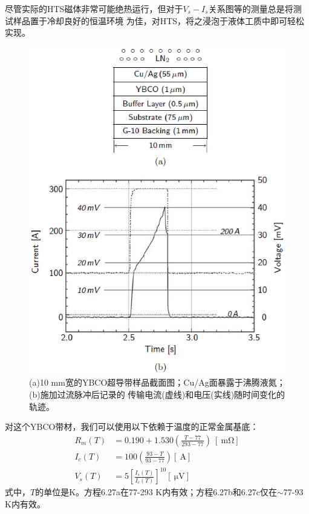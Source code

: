 尽管实际的HTS磁体非常可能绝热运行，但对于$V_s-I_s$关系图等的测量总是将测试样品置于冷却良好的恒温环境
为佳，对HTS，将之浸泡于液体工质中即可轻松实现。
\begin{figure}[htbp]
	\centering
	\includegraphics[scale=0.5]{chpt6/figs/fig6.12.eps}
	\caption{(a)10 mm宽的YBCO超导带样品截面图；Cu/Ag面暴露于沸腾液氮；(b)施加过流脉冲后记录的
		传输电流(虚线)和电压(实线)随时间变化的轨迹。}
\end{figure}
对这个YBCO带材，我们可以使用以下依赖于温度的正常金属基底：
\begin{subequations}
	\begin{align}
	R_m(T)&=0.190+1.530(\frac{T-77}{293-77})\ [\ \mathrm{m\Omega}]\\
	I_c(T)&=100(\frac{93-T}{93-77})[\ \mathrm{A}]\\
	V_s(T)&=5[\frac{I_s(T)}{I_c(T)}]^{10} [\ \mathrm{\mu V}]
	\end{align}
\end{subequations}
式中，$T$的单位是K。方程6.27a在77-293 K内有效；方程6.27b和6.27c仅在$\sim $77-93 K内有效。


